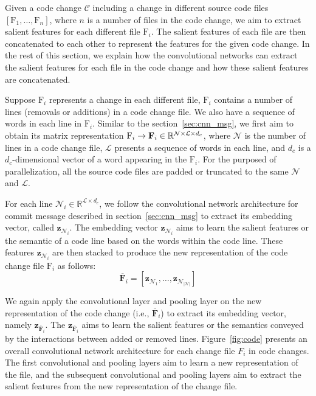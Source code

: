 Given a code change $\mathcal{C}$ including a change in different source code files $[\text{F}_1, \dots, \text{F}_n]$, where $n$ is a number of files in the code change, we aim to extract salient features for each different file $\text{F}_i$. The salient features of each file are then concatenated to each other to represent the features for the given code change. In the rest of this section, we explain how the convolutional networks can extract the salient features for each file in the code change and how these salient features are concatenated. 

Suppose $\text{F}_i$ represents a change in each different file, $\text{F}_i$ contains a number of lines (removals or additions) in a code change file. We also have a sequence of words in each line in $\text{F}_i$. Similar to the section~\ref{sec:cnn_msg}, we first aim to obtain its matrix representation $\text{F}_i \rightarrow \textbf{\text{F}}_i \in \mathbb{R}^{\mathcal{N} \times \mathcal{L} \times{d_c}}$, where $\mathcal{N}$ is the number of lines in a code change file, $\mathcal{L}$ presents a sequence of words in each line, and $d_c$ is a $d_c$-dimensional vector of a word appearing in the $\text{F}_i$. For the purposed of parallelization, all the source code files are padded or truncated to the same $\mathcal{N}$ and $\mathcal{L}$. 

For each line $\mathcal{N}_i \in \mathbb{R}^{\mathcal{L} \times d_c}$, we follow the convolutional network architecture for commit message described in section~\ref{sec:cnn_msg} to extract its embedding vector, called $\textbf{z}_{\mathcal{N}_i}$. The embedding vector $\textbf{z}_{\mathcal{N}_i}$ aims to learn the salient features or the semantic of a code line based on the words within the code line. These features $\textbf{z}_{\mathcal{N}_i}$ are then stacked to produce the new representation of the code change file $\text{F}_i$ as follows: 
\begin{equation}
\label{eq:concatenate}
\overline{\textbf{F}}_{i} = [\textbf{z}_{\mathcal{N}_1}, \dots, \textbf{z}_{\mathcal{N}_{|\mathcal{N}|}}]
\end{equation}

We again apply the convolutional layer and pooling layer on the new representation of the code change (i.e., $\overline{\textbf{F}}_{i}$) to extract its embedding vector, namely $\textbf{z}_{\overline{\textbf{F}}_{i}}$. The $\textbf{z}_{\overline{\textbf{F}}_{i}}$ aims to learn the salient features or the semantics conveyed by the interactions between added or removed lines. Figure~\ref{fig:code} presents an overall convolutional network architecture for each change file $F_i$ in code changes. The first convolutional and pooling layers aim to learn a new representation of the file, and the subsequent convolutional and pooling layers aim to extract the salient features from the new representation of the change file. 

